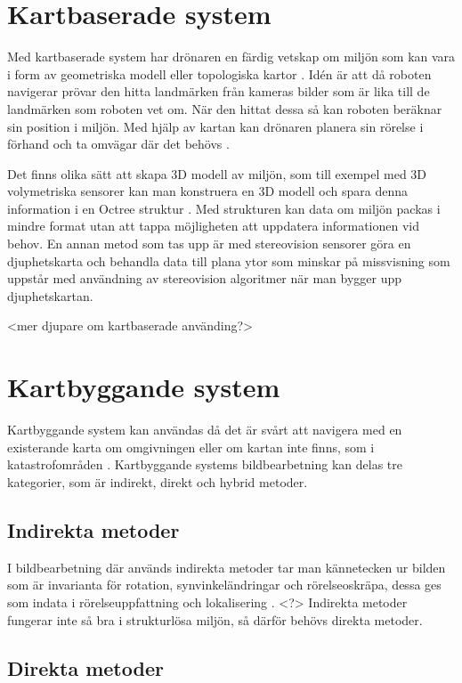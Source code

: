 \section{Kartbaserade system}

Med kartbaserade system har drönaren en färdig vetskap om miljön som kan vara i form av geometriska modell eller topologiska kartor \citep{982903}. Idén är att då roboten navigerar prövar den hitta landmärken från kameras bilder som är lika till de landmärken som roboten vet om. När den hittat dessa så kan roboten beräknar sin position i miljön. Med hjälp av kartan kan drönaren planera sin rörelse i förhand och ta omvägar där det behövs \citep{geospatial}. 

Det finns olika sätt att skapa 3D modell av miljön, som till exempel med 3D volymetriska sensorer kan man konstruera en 3D modell och spara denna information i en Octree struktur \citep{geospatial}. Med strukturen kan data om miljön packas i mindre format utan att tappa möjligheten att uppdatera informationen vid behov. En annan metod som tas upp är med stereovision sensorer göra en djuphetskarta och behandla data till plana ytor som minskar på missvisning som uppstår med användning av stereovision algoritmer när man bygger upp djuphetskartan.

<mer djupare om kartbaserade använding?>

\section{Kartbyggande system}

Kartbyggande system kan användas då det är svårt att navigera med en existerande karta om omgivningen eller om kartan inte finns, som i katastrofområden \citep{geospatial}. Kartbyggande systems bildbearbetning kan delas tre kategorier, som är indirekt, direkt och hybrid metoder.

\subsection{Indirekta metoder}

I bildbearbetning där används indirekta metoder tar man kännetecken ur bilden som är invarianta för rotation, synvinkeländringar och rörelseoskräpa, dessa ges som indata i rörelseuppfattning och lokalisering \citep{geospatial}. <?> Indirekta metoder fungerar inte så bra i strukturlösa miljön, så därför behövs direkta metoder. 

\subsection{Direkta metoder}

